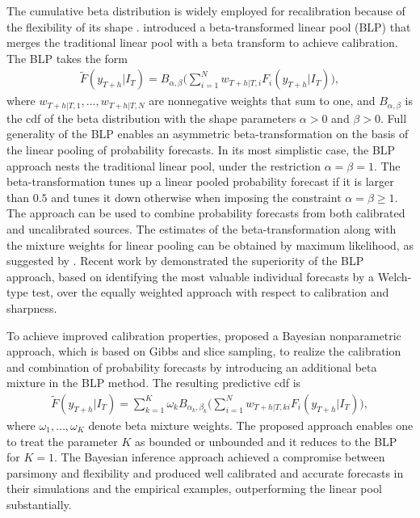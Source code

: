 \documentclass[a4paper,11pt]{article}
\begin{document}
The cumulative beta distribution is widely employed for recalibration because of the flexibility of its shape \citep[see, e.g.,][]{Graham1996-qc}. \citet{Ranjan2010-jl} introduced a beta-transformed linear pool (BLP) that merges the traditional linear pool with a beta transform to achieve calibration. The BLP takes the form
\begin{align*}
  \tilde{F}(y_{T+h}|I_{T}) = B_{\alpha, \beta}\bigg(\sum_{i=1}^{N} w_{T+h|T,i} F_{i}(y_{T+h}|I_{T})\bigg),
\end{align*}
where $w_{T+h|T,1},\dots,w_{T+h|T,N}$ are nonnegative weights that sum to one, and $B_{\alpha, \beta}$ is the cdf of the beta distribution with the shape parameters $\alpha > 0$ and $\beta > 0$. Full generality of the BLP enables an asymmetric beta-transformation on the basis of the linear pooling of probability forecasts. In its most simplistic case, the BLP approach nests the traditional linear pool, under the restriction $\alpha = \beta = 1$. The beta-transformation tunes up a linear pooled probability forecast if it is larger than $0.5$ and tunes it down otherwise when imposing the constraint $\alpha = \beta \geq 1$. The approach can be used to combine probability forecasts from both calibrated and uncalibrated sources. The estimates of the beta-transformation along with the mixture weights for linear pooling can be obtained by maximum likelihood, as suggested by \citet{Ranjan2010-jl}. Recent work by \citet{Lahiri2015-qq} demonstrated the superiority of the BLP approach, based on identifying the most valuable individual forecasts by a Welch-type test, over the equally weighted approach with respect to calibration and sharpness.

To achieve improved calibration properties, \citet{Bassetti2018-qr} proposed a Bayesian nonparametric approach, which is based on Gibbs and slice sampling, to realize the calibration and combination of probability forecasts by introducing an additional beta mixture in the BLP method. The resulting predictive cdf is
\begin{align*}
  \tilde{F}(y_{T+h}|I_{T}) = \sum_{k=1}^{K} \omega_{k} B_{\alpha_{k}, \beta_{k}}\bigg(\sum_{i=1}^{N} w_{T+h|T,ki} F_{i}(y_{T+h}|I_{T})\bigg),
\end{align*}
where $\omega_{1}, \dots, \omega_{K}$ denote beta mixture weights. The proposed approach enables one to treat the parameter $K$ as bounded or unbounded and it reduces to the BLP for $K=1$. The Bayesian inference approach achieved a compromise between parsimony and flexibility and produced well calibrated and accurate forecasts in their simulations and the empirical examples, outperforming the linear pool substantially.
\end{document}
